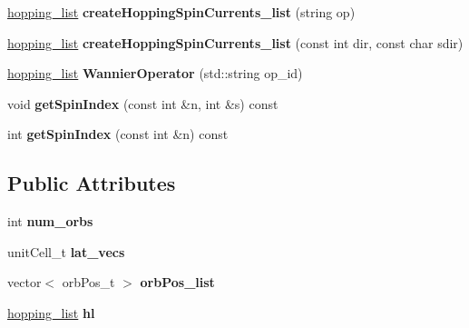 \begin{DoxyCompactItemize}
\item 
\hyperlink{classhopping__list}{hopping\+\_\+list} {\bfseries create\+Hopping\+Spin\+Currents\+\_\+list} (string op)\hypertarget{classtbmodel_a60707b51717f19e59be4876696263c08}{}\label{classtbmodel_a60707b51717f19e59be4876696263c08}

\item 
\hyperlink{classhopping__list}{hopping\+\_\+list} {\bfseries create\+Hopping\+Spin\+Currents\+\_\+list} (const int dir, const char sdir)\hypertarget{classtbmodel_aaad3f86a13ac29afdb6d6c6cd1e9d431}{}\label{classtbmodel_aaad3f86a13ac29afdb6d6c6cd1e9d431}

\item 
\hyperlink{classhopping__list}{hopping\+\_\+list} {\bfseries Wannier\+Operator} (std\+::string op\+\_\+id)\hypertarget{classtbmodel_aabcd375bbfa508596bb233012f9f2a03}{}\label{classtbmodel_aabcd375bbfa508596bb233012f9f2a03}

\item 
void {\bfseries get\+Spin\+Index} (const int \&n, int \&s) const \hypertarget{classtbmodel_a5e74702b6bb666df50783887f50e34c2}{}\label{classtbmodel_a5e74702b6bb666df50783887f50e34c2}

\item 
int {\bfseries get\+Spin\+Index} (const int \&n) const \hypertarget{classtbmodel_adfedf8e29bd8919448a16dc820ef60ed}{}\label{classtbmodel_adfedf8e29bd8919448a16dc820ef60ed}

\end{DoxyCompactItemize}
\subsection*{Public Attributes}
\begin{DoxyCompactItemize}
\item 
int {\bfseries num\+\_\+orbs}\hypertarget{classtbmodel_a6401dfc2dba0df5409a92c069e1de0f0}{}\label{classtbmodel_a6401dfc2dba0df5409a92c069e1de0f0}

\item 
unit\+Cell\+\_\+t {\bfseries lat\+\_\+vecs}\hypertarget{classtbmodel_a2837b8aab16e5e679302894609b7f7af}{}\label{classtbmodel_a2837b8aab16e5e679302894609b7f7af}

\item 
vector$<$ orb\+Pos\+\_\+t $>$ {\bfseries orb\+Pos\+\_\+list}\hypertarget{classtbmodel_ae7d346cc58028b41581412751a16a87f}{}\label{classtbmodel_ae7d346cc58028b41581412751a16a87f}

\item 
\hyperlink{classhopping__list}{hopping\+\_\+list} {\bfseries hl}\hypertarget{classtbmodel_acf3031a7eed087a88ec733bc4ea2df9f}{}\label{classtbmodel_acf3031a7eed087a88ec733bc4ea2df9f}

\end{DoxyCompactItemize}


